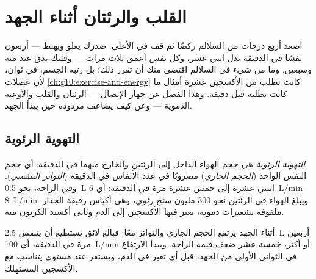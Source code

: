 \chapter{القلب والرئتان أثناء الجهد}\label{ch:g10:heart-lungs-effort}

اصعد أربع درجات من السلالم ركضًا ثم قف في الأعلى. صدرك يعلو ويهبط ---
أربعون نفسًا في الدقيقة بدل اثني عشر، وكل نفس أعمق ثلاث مرات ---
وقلبك يدق عند مئة وسبعين. وما من شيء في السلالم اقتضى منك أن تقرر ذلك؛
بل رتبه الجسم، في ثوان، لأن عضلات \cref{ch:g10:exercise-and-energy}
كانت تطلب من الأكسجين عشرة أمثال ما كانت تطلبه قبل دقيقة. وهذا الفصل
عن جهاز الإيصال --- الرئتان والقلب والأوعية الدموية --- وعن كيف يضاعف
مردوده حين يبدأ الجهد.

\section{التهوية الرئوية}

\begin{definition}\label{def:g10:heart-lungs-effort:ventilation}
\emph{التهوية الرئوية} هي حجم الهواء الداخل إلى
الرئتين والخارج منهما في الدقيقة: أي حجم النفس الواحد (\emph{الحجم
الجاري}) مضروبًا في عدد الأنفاس في الدقيقة (\emph{التواتر التنفسي}).
وفي الراحة، نحو \qty{0.5}{L} اثنتي عشرة إلى خمس عشرة مرة في الدقيقة:
أي \qtyrange{6}{8}{L/min}. ويبلغ الهواء في الرئتين نحو 300 مليون
\emph{سنخ رئوي}، وهي أكياس رقيقة الجدار ملفوفة
بشعيرات دموية، يعبر فيها الأكسجين إلى الدم وثاني أكسيد الكربون منه.
\end{definition}

\begin{proposition}\label{prop:g10:heart-lungs-effort:vent-exercise}
أثناء الجهد يرتفع الحجم الجاري والتواتر معًا: فبالغ لائق يستطيع أن
يتنفس \qty{2.5}{L} أربعين مرة في الدقيقة، أي \qty{100}{L/min} أو
أكثر، خمسة عشر ضعف قيمة الراحة. ويبدأ الارتفاع في الثواني الأولى من
الجهد، قبل أي تغير في الدم، ويستقر عند مستوى يتناسب مع الأكسجين
المستهلك.
\end{proposition}
\admitted

